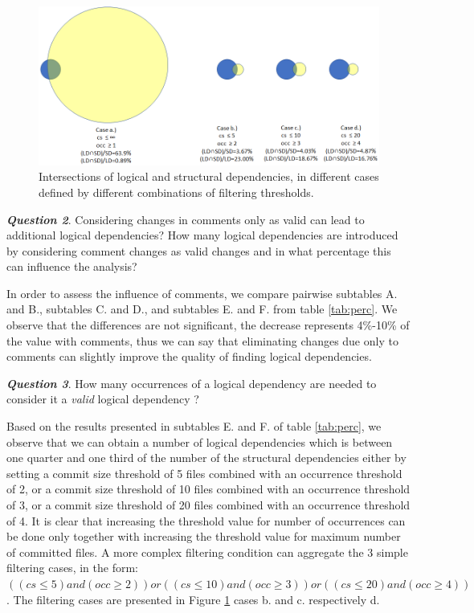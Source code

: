 \documentclass[conference]{IEEEtran}
\begin{document}
\begin{figure}[!t]
\centering
\includegraphics[width=6in]{figvennpdf.png}
\caption{Intersections of logical and structural dependencies, in different cases defined by different combinations of filtering thresholds. }
\label{fig_venn}
\end{figure}




\textit{\textbf{Question 2}}. Considering changes in comments only as valid can lead to additional logical dependencies? How many logical dependencies are introduced by considering comment changes as valid changes and in what percentage this can influence the analysis?

In order to assess the influence of comments, we compare pairwise subtables A. and B.,  subtables C. and D., and subtables E. and F. from table \ref{tab:perc}. We observe that the differences are not significant, the decrease represents  4\%-10\% of the value with comments, thus we can say that eliminating changes due only to comments can slightly improve the quality of finding logical dependencies.


\textit{\textbf{Question 3}}. How many occurrences of a logical dependency are needed to consider it a \textit{valid} logical dependency ? 

Based on the results presented in subtables E. and F. of table \ref{tab:perc}, we observe that we can obtain a number of logical dependencies which is between one quarter and one third of the number of the structural dependencies either by setting a commit size threshold of 5 files combined with an occurrence threshold of 2, or a commit size threshold of 10 files combined with an occurrence threshold of 3, or a commit size threshold of 20 files combined with an occurrence threshold of 4.  It is clear that increasing the threshold value for number of occurrences can be done only together with increasing the threshold value for maximum number of committed files. A more complex filtering condition can aggregate the 3 simple filtering cases, in the form: $((cs\leq 5) and (occ\geq 2)) or ((cs\leq 10) and (occ\geq 3)) or ((cs\leq 20) and (occ\geq 4))$. The filtering cases are presented in Figure \ref{fig_venn} cases b. and c. respectively d.
\end{document}
